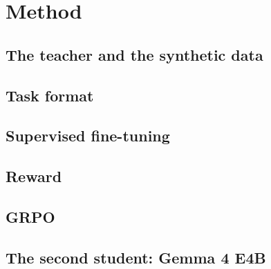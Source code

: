 \chapter{Method}\label{ch:method}

\section{The teacher and the synthetic data}

\section{Task format}

\section{Supervised fine-tuning}

\section{Reward}

\section{GRPO}

\section{The second student: Gemma 4 E4B}
